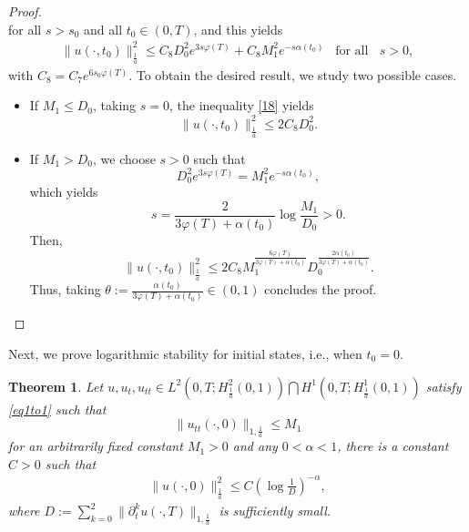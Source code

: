 \documentclass[reqno]{amsart}
\theoremstyle{plain}
\newtheorem{theorem}{Theorem}[section]
\theoremstyle{remark}
\numberwithin{equation}{section}
\begin{document}
\begin{proof}
\begin{equation*}
\end{equation*}
for all $s>s_{0}$ and all $t_{0}\in (0,T)$, and this yields 
\begin{align}\label{18}
   \| u(\cdot,t_{0})\|_{\frac{1}{a}}^2 \leqslant C_{8}D_{0}^2e^{3s\varphi(T)} +C_{8}M_1^2e^{-s\alpha(t_{0})} \;\;\; \text{for all } \;\; s>0,
\end{align}
with $C_{8}=C_{7}e^{6s_{0}\varphi(T)}.$
To obtain the desired result, we study two possible cases.
\begin{itemize}
    \item If $M_1\leqslant D_{0}$,  taking $s=0$, the inequality \eqref{18} yields 
    $$ \| u(\cdot,t_{0})\|_{\frac{1}{a}}^2 \leq 2 C_{8}D_{0}^2.$$
    \item  If $M_1>D_{0}$, we choose $s>0$ such that 
    $$ D_{0}^2e^{3s\varphi(T)}=M_1^2e^{-s\alpha(t_{0})},
    $$
which yields
$$ s= \frac{2}{3\varphi(T)+\alpha(t_{0})}\log\frac{M_1}{D_{0}}>0.
$$
Then, 
$$ \| u(\cdot,t_{0})\|_{\frac{1}{a}}^2 \leqslant 2 C_{8}M_1^{\frac{6\varphi(T)}{3\varphi(T)+\alpha(t_{0})}}D_{0}^{\frac{2\alpha(t_{0})}{3\varphi(T)+\alpha(t_{0})}}.$$
Thus, taking $\theta:=\frac{\alpha(t_{0})}{3\varphi(T)+\alpha(t_{0})}\in (0,1)$ concludes the proof.
\end{itemize}
\end{proof}

Next, we prove logarithmic stability for initial states, i.e., when $t_{0}=0$.
\begin{theorem}\label{thmstab}
Let $u,u_t,u_{tt} \in L^2\left(0,T;H^2_{\frac{1}{a}}(0,1)\right)\bigcap H^1\left(0,T; H^1_{\frac{1}{a}}(0,1)\right)$ satisfy \eqref{eq1to1} such that
   $$\| u_{tt}(\cdot,0)\|_{1,\frac{1}{a}}\leqslant M_{1}$$
for an arbitrarily fixed constant \( M_1 > 0 \) and any \( 0 < \alpha < 1 \), there is a constant \( C > 0 \) such that
   \begin{align*}
       \| u(\cdot,0)\| _{\frac{1}{a}}^2\leqslant C \left(\log\frac{1}{D}\right)^{-\alpha},
   \end{align*}
where $D:=\displaystyle \sum_{k=0}^2\| \partial_{t}^k u(\cdot,T)\|_{1,\frac{1}{a}}$ is sufficiently small.
\end{theorem}
\end{document}
